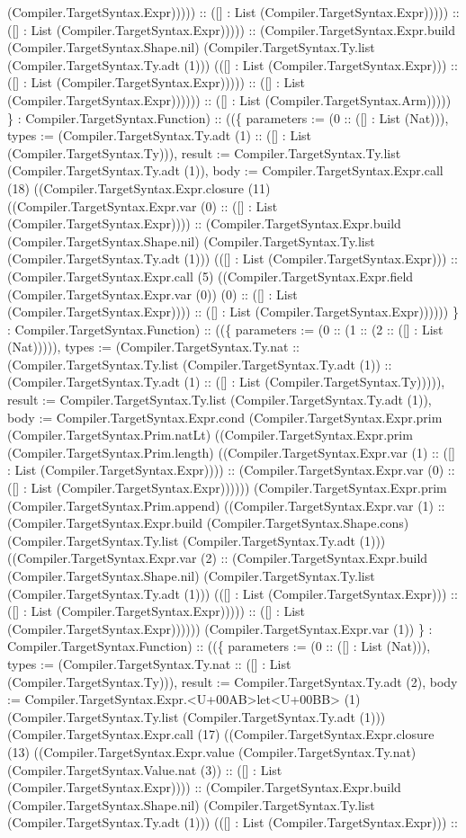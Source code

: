 \documentclass[11pt]{article}
\begin{document}
(Compiler.TargetSyntax.Expr))))) :: ([] : List (Compiler.TargetSyntax.Expr))))) :: ([] : List (Compiler.TargetSyntax.Expr))))) :: (Compiler.TargetSyntax.Expr.build (Compiler.TargetSyntax.Shape.nil) (Compiler.TargetSyntax.Ty.list (Compiler.TargetSyntax.Ty.adt (1))) (([] : List (Compiler.TargetSyntax.Expr))) :: ([] : List (Compiler.TargetSyntax.Expr))))) :: ([] : List (Compiler.TargetSyntax.Expr)))))) :: ([] : List (Compiler.TargetSyntax.Arm))))) \} : Compiler.TargetSyntax.Function) :: ((\{ parameters := (0 :: ([] : List (Nat))), types := (Compiler.TargetSyntax.Ty.adt (1) :: ([] : List (Compiler.TargetSyntax.Ty))), result := Compiler.TargetSyntax.Ty.list (Compiler.TargetSyntax.Ty.adt (1)), body := Compiler.TargetSyntax.Expr.call (18) ((Compiler.TargetSyntax.Expr.closure (11) ((Compiler.TargetSyntax.Expr.var (0) :: ([] : List (Compiler.TargetSyntax.Expr)))) :: (Compiler.TargetSyntax.Expr.build (Compiler.TargetSyntax.Shape.nil) (Compiler.TargetSyntax.Ty.list (Compiler.TargetSyntax.Ty.adt (1))) (([] : List (Compiler.TargetSyntax.Expr))) :: (Compiler.TargetSyntax.Expr.call (5) ((Compiler.TargetSyntax.Expr.field (Compiler.TargetSyntax.Expr.var (0)) (0) :: ([] : List (Compiler.TargetSyntax.Expr)))) :: ([] : List (Compiler.TargetSyntax.Expr)))))) \} : Compiler.TargetSyntax.Function) :: ((\{ parameters := (0 :: (1 :: (2 :: ([] : List (Nat))))), types := (Compiler.TargetSyntax.Ty.nat :: (Compiler.TargetSyntax.Ty.list (Compiler.TargetSyntax.Ty.adt (1)) :: (Compiler.TargetSyntax.Ty.adt (1) :: ([] : List (Compiler.TargetSyntax.Ty))))), result := Compiler.TargetSyntax.Ty.list (Compiler.TargetSyntax.Ty.adt (1)), body := Compiler.TargetSyntax.Expr.cond (Compiler.TargetSyntax.Expr.prim (Compiler.TargetSyntax.Prim.natLt) ((Compiler.TargetSyntax.Expr.prim (Compiler.TargetSyntax.Prim.length) ((Compiler.TargetSyntax.Expr.var (1) :: ([] : List (Compiler.TargetSyntax.Expr)))) :: (Compiler.TargetSyntax.Expr.var (0) :: ([] : List (Compiler.TargetSyntax.Expr)))))) (Compiler.TargetSyntax.Expr.prim (Compiler.TargetSyntax.Prim.append) ((Compiler.TargetSyntax.Expr.var (1) :: (Compiler.TargetSyntax.Expr.build (Compiler.TargetSyntax.Shape.cons) (Compiler.TargetSyntax.Ty.list (Compiler.TargetSyntax.Ty.adt (1))) ((Compiler.TargetSyntax.Expr.var (2) :: (Compiler.TargetSyntax.Expr.build (Compiler.TargetSyntax.Shape.nil) (Compiler.TargetSyntax.Ty.list (Compiler.TargetSyntax.Ty.adt (1))) (([] : List (Compiler.TargetSyntax.Expr))) :: ([] : List (Compiler.TargetSyntax.Expr))))) :: ([] : List (Compiler.TargetSyntax.Expr)))))) (Compiler.TargetSyntax.Expr.var (1)) \} : Compiler.TargetSyntax.Function) :: ((\{ parameters := (0 :: ([] : List (Nat))), types := (Compiler.TargetSyntax.Ty.nat :: ([] : List (Compiler.TargetSyntax.Ty))), result := Compiler.TargetSyntax.Ty.adt (2), body := Compiler.TargetSyntax.Expr.<U+00AB>let<U+00BB> (1) (Compiler.TargetSyntax.Ty.list (Compiler.TargetSyntax.Ty.adt (1))) (Compiler.TargetSyntax.Expr.call (17) ((Compiler.TargetSyntax.Expr.closure (13) ((Compiler.TargetSyntax.Expr.value (Compiler.TargetSyntax.Ty.nat) (Compiler.TargetSyntax.Value.nat (3)) :: ([] : List (Compiler.TargetSyntax.Expr)))) :: (Compiler.TargetSyntax.Expr.build (Compiler.TargetSyntax.Shape.nil) (Compiler.TargetSyntax.Ty.list (Compiler.TargetSyntax.Ty.adt (1))) (([] : List (Compiler.TargetSyntax.Expr))) :: 
\end{document}
